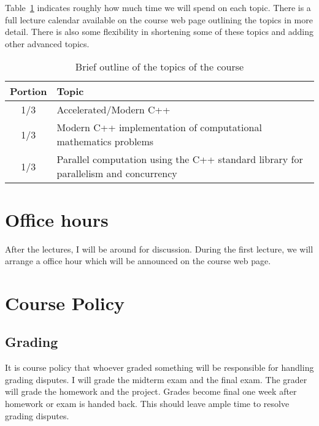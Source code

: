 \documentclass[11pt,letterpaper]{article}
\begin{document}
Table~\ref{tab:outline} indicates roughly how much time we will spend on each topic. There  is  a  full  lecture  calendar  available  on  the  course  web page  outlining  the  topics  in  more  detail. There  is  also some flexibility in shortening some of these topics and adding other advanced topics.

\begin{table}[b]
\centering
\begin{tabular}{cl}
\hline
Portion & Topic \\
\hline
1/3 & Accelerated/Modern C++\\
1/3 & Modern C++ implementation of computational mathematics problems \\
1/3 & Parallel computation using the C++ standard library for parallelism and concurrency \\
\hline
\end{tabular}
\caption{Brief outline of the topics of the course}
\label{tab:outline}
\end{table}

\section*{Office hours}
After the lectures, I will be around for discussion. During the first lecture, we will arrange a office hour which will be announced on the course web page.

\section*{Course Policy}

\subsection*{Grading}
It is course policy that whoever graded something will be responsible for handling grading disputes. I will grade the midterm exam and the final exam. The grader will grade the homework and the project. Grades become final one week after homework or exam is handed back. This should leave ample time to resolve grading disputes.
\end{document}
